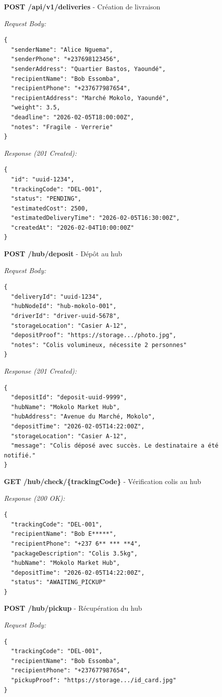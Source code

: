 \textbf{POST /api/v1/deliveries} - Création de livraison

\textit{Request Body:}
\begin{verbatim}
{
  "senderName": "Alice Nguema",
  "senderPhone": "+237698123456",
  "senderAddress": "Quartier Bastos, Yaoundé",
  "recipientName": "Bob Essomba",
  "recipientPhone": "+237677987654",
  "recipientAddress": "Marché Mokolo, Yaoundé",
  "weight": 3.5,
  "deadline": "2026-02-05T18:00:00Z",
  "notes": "Fragile - Verrerie"
}
\end{verbatim}

\textit{Response (201 Created):}
\begin{verbatim}
{
  "id": "uuid-1234",
  "trackingCode": "DEL-001",
  "status": "PENDING",
  "estimatedCost": 2500,
  "estimatedDeliveryTime": "2026-02-05T16:30:00Z",
  "createdAt": "2026-02-04T10:00:00Z"
}
\end{verbatim}

\textbf{POST /hub/deposit} - Dépôt au hub

\textit{Request Body:}
\begin{verbatim}
{
  "deliveryId": "uuid-1234",
  "hubNodeId": "hub-mokolo-001",
  "driverId": "driver-uuid-5678",
  "storageLocation": "Casier A-12",
  "depositProof": "https://storage.../photo.jpg",
  "notes": "Colis volumineux, nécessite 2 personnes"
}
\end{verbatim}

\textit{Response (201 Created):}
\begin{verbatim}
{
  "depositId": "deposit-uuid-9999",
  "hubName": "Mokolo Market Hub",
  "hubAddress": "Avenue du Marché, Mokolo",
  "depositTime": "2026-02-05T14:22:00Z",
  "storageLocation": "Casier A-12",
  "message": "Colis déposé avec succès. Le destinataire a été notifié."
}
\end{verbatim}

\textbf{GET /hub/check/\{trackingCode\}} - Vérification colis au hub

\textit{Response (200 OK):}
\begin{verbatim}
{
  "trackingCode": "DEL-001",
  "recipientName": "Bob E*****",
  "recipientPhone": "+237 6** *** **4",
  "packageDescription": "Colis 3.5kg",
  "hubName": "Mokolo Market Hub",
  "depositTime": "2026-02-05T14:22:00Z",
  "status": "AWAITING_PICKUP"
}
\end{verbatim}

\textbf{POST /hub/pickup} - Récupération du hub

\textit{Request Body:}
\begin{verbatim}
{
  "trackingCode": "DEL-001",
  "recipientName": "Bob Essomba",
  "recipientPhone": "+237677987654",
  "pickupProof": "https://storage.../id_card.jpg"
}
\end{verbatim}

